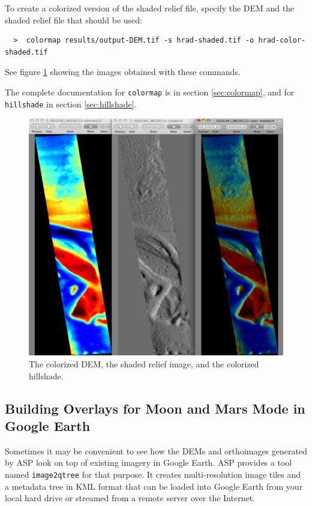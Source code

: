 To create a colorized version of the shaded relief file, specify
the \ac{DEM} and the shaded relief file that should be used:

\begin{verbatim}
  >  colormap results/output-DEM.tif -s hrad-shaded.tif -o hrad-color-shaded.tif
\end{verbatim}

See figure \ref{hrad-color} showing the images obtained with these commands.

The complete documentation for \texttt{colormap} is in section
\ref{sec:colormap}, and for \texttt{hillshade} in section \ref{sec:hillshade}.

\begin{figure}[b!]
\begin{center}
\includegraphics[width=4.7in]{images/p19-colorized-shaded_500px.png}
\caption[Hrad colorized and shaded relief]{
  \label{hrad-color}
  The colorized DEM, the shaded relief image, and the colorized hillshade.
}
\end{center}
\end{figure}

\newpage
\subsection{Building Overlays for Moon and Mars Mode in Google Earth}

Sometimes it may be convenient to see how the DEMs and orthoimages
generated by ASP look on top of existing imagery in Google Earth. ASP
provides a tool named \texttt{image2qtree} for that purpose. It creates
multi-resolution image tiles and a metadata tree in KML format that can
be loaded into Google Earth from your local hard drive or streamed from
a remote server over the Internet.

